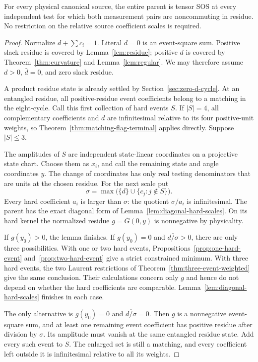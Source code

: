 \begin{theorem}
\label{thm:all-noncommuting}
For every physical canonical source, the entire parent is tensor SOS at every independent test for which both measurement pairs are noncommuting in residue. No restriction on the relative source coefficient scales is required.
\end{theorem}
\begin{proof}
Normalize $d+\sum c_i=1$. Literal $d=0$ is an event-square sum. Positive slack residue is covered by Lemma~\ref{lem:residue}; positive $\bar d$ is covered by Theorem~\ref{thm:curvature} and Lemma~\ref{lem:regular}. We may therefore assume $d>0$, $\bar d=0$, and zero slack residue.

A product residue state is already settled by Section~\ref{sec:zero-d-cycle}. At an entangled residue, all positive-residue event coefficients belong to a matching in the eight-cycle. Call this first collection of hard events $S$. If $|S|=4$, all complementary coefficients and $d$ are infinitesimal relative to its four positive-unit weights, so Theorem~\ref{thm:matching-flag-terminal} applies directly. Suppose $|S|\le3$.

The amplitudes of $S$ are independent state-linear coordinates on a projective state chart. Choose them as $x_i$, and call the remaining state and angle coordinates $y$. The change of coordinates has only real testing denominators that are units at the chosen residue. For the next scale put
\[
\sigma=\max\bigl(\{d\}\cup\{c_j:j\notin S\}\bigr).
\]
Every hard coefficient $a_i$ is larger than $\sigma$: the quotient $\sigma/a_i$ is infinitesimal. The parent has the exact diagonal form of Lemma~\ref{lem:diagonal-hard-scales}. On its hard kernel the normalized residue $g=\overline G(0,y)$ is nonnegative by physicality.

If $g(y_0)>0$, the lemma finishes. If $g(y_0)=0$ and $\overline{d/\sigma}>0$, there are only three possibilities. With one or two hard events, Propositions~\ref{prop:one-hard-event} and~\ref{prop:two-hard-event} give a strict constrained minimum. With three hard events, the two Laurent restrictions of Theorem~\ref{thm:three-event-weighted} give the same conclusion. Their calculations concern only $g$ and hence do not depend on whether the hard coefficients are comparable. Lemma~\ref{lem:diagonal-hard-scales} finishes in each case.

The only alternative is $g(y_0)=0$ and $\overline{d/\sigma}=0$. Then $g$ is a nonnegative event-square sum, and at least one remaining event coefficient has positive residue after division by $\sigma$. Its amplitude must vanish at the same entangled residue state. Add every such event to $S$. The enlarged set is still a matching, and every coefficient left outside it is infinitesimal relative to all its weights.


\end{proof}
